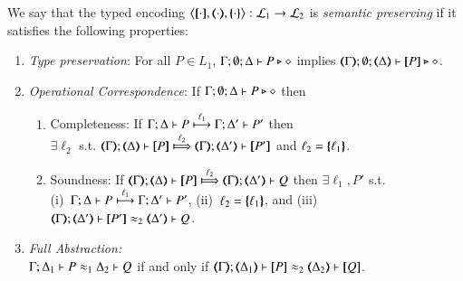 \begin{definition}\rm
	\label{def:ep}
	We say that 
	the typed encoding 
	$\enco{\map{\cdot}, \mapt{\cdot}, \mapa{\cdot}}: \tyl{L}_1 \to \tyl{L}_2$ is \emph{semantic preserving}
	if it satisfies the following properties:
	
	\begin{enumerate}[1.]
		\item	\emph{Type preservation}:
			For all $P \in L_1$,
			$\Gamma; \emptyset; \Delta \proves P \hastype \Proc$ implies
			$\mapt{\Gamma}; \emptyset; \mapt{\Delta} \proves \map{P} \hastype \Proc$.

		\item \emph{Operational Correspondence}: If $\Gamma; \emptyset; \Delta \proves P \hastype \Proc$ then
		\begin{enumerate}[-]
			\item	Completeness: 
				If  $\stytra{\Gamma}{\ell_1}{\Delta}{P}{\Delta'}{P'}$
				then \\ $\exists \ell_2$ s.t. 
				$\wtytra{\mapt{\Gamma}}{\ell_2}{\mapt{\Delta}}{\map{P}}{\mapt{\Delta'}}{\map{P'}}$
				and $\ell_2 = \mapa{\ell_1}$.

			    				
			\item	Soundness:   
				If  $\wtytra{\mapt{\Gamma}}{\ell_2}{\mapt{\Delta}}{\map{P}}{\mapt{\Delta'}}{Q}$
				then $\exists \ell_1, P'$ s.t.  \\
				(i)~$\stytra{\Gamma}{\ell_1}{\Delta}{P}{\Delta'}{P'}$,
				(ii)~$\ell_2 = \mapa{\ell_1}$, and
				(iii)~$\horel{\mapt{\Gamma}}{\mapt{\Delta'}}{\map{P'}}{\wb_2}{\mapt{\Delta'}}{Q}$.
		\end{enumerate}
		
		\item	\emph{Full Abstraction:} \\
			$\horel{\Gamma}{\Delta_1}{P}{\wb_1}{\Delta_2}{Q}$
			if and only if
			$\horel{\mapt{\Gamma}}{\mapt{\Delta_1}}{\map{P}}{\wb_2}{\mapt{\Delta_2}}{\map{Q}}$.
	\end{enumerate}
\end{definition}

